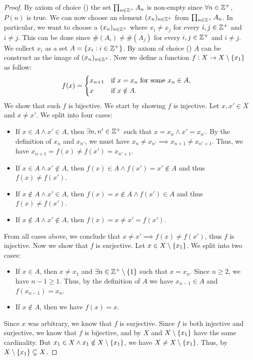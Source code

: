 \begin{proof}
  By axiom of choice () the set \(\prod_{n \in \mathbb{Z}^+} A_n\) is non-empty since \(\forall n \in \mathbb{Z}^+\), \(P(n)\) is true.
  We can now choose an element \((x_n)_{n \in \mathbb{Z}^+}\) from \(\prod_{n \in \mathbb{Z}^+} A_n\).
  In particular, we want to choose a \((x_n)_{n \in \mathbb{Z}^+}\) where \(x_i \neq x_j\) for every \(i, j \in \mathbb{Z}^+\) and \(i \neq j\).
  This can be done since \(\#(A_i) \neq \#(A_j)\) for every \(i, j \in \mathbb{Z}^+\) and \(i \neq j\).
  We collect \(x_i\) as a set \(A = \left\lbrace x_i : i \in \mathbb{Z}^+\right\rbrace\).
  By axiom of choice () \(A\) can be construct as the image of \((x_n)_{n \in \mathbb{Z}^+}\).
  Now we define a function \(f : X \to X \setminus \left\lbrace x_1\right\rbrace\) as follow:
  \[
    f(x) = \begin{dcases}
      x_{n + 1} & \text{if } x = x_n \text{ for some } x_n \in A, \\
      x         & \text{if } x \notin A.
    \end{dcases}
  \]
  We show that such \(f\) is bijective.
  We start by showing \(f\) is injective.
  Let \(x, x' \in X\) and \(x \neq x'\).
  We split into four cases:
  \begin{itemize}
    \item If \(x \in A \land x' \in A\), then \(\exists n, n' \in \mathbb{Z}^+\) such that \(x = x_n \land x' = x_{n'}\).
          By the definition of \(x_n\) and \(x_{n'}\), we must have \(x_n \neq x_{n'} \implies x_{n + 1} \neq x_{n' + 1}\).
          Thus, we have \(x_{n + 1} = f(x) \neq f(x') = x_{n' + 1}\).
    \item If \(x \in A \land x' \notin A\), then \(f(x) \in A \land f(x') = x' \notin A\) and thus \(f(x) \neq f(x')\).
    \item If \(x \notin A \land x' \in A\), then \(f(x) = x \notin A \land f(x') \in A\) and thus \(f(x) \neq f(x')\).
    \item If \(x \notin A \land x' \notin A\), then \(f(x) = x \neq x' = f(x')\).
  \end{itemize}
  From all cases above, we conclude that \(x \neq x' \implies f(x) \neq f(x')\), thus \(f\) is injective.
  Now we show that \(f\) is surjective.
  Let \(x \in X \setminus \left\lbrace x_1\right\rbrace\).
  We split into two cases:
  \begin{itemize}
    \item If \(x \in A\), then \(x \neq x_1\) and \(\exists n \in \mathbb{Z}^+ \setminus \left\lbrace1\right\rbrace\) such that \(x = x_n\).
          Since \(n \geq 2\), we have \(n - 1 \geq 1\).
          Thus, by the definition of \(A\) we have \(x_{n - 1} \in A\) and \(f(x_{n - 1}) = x_n\).
    \item If \(x \notin A\), then we have \(f(x) = x\).
  \end{itemize}
  Since \(x\) was arbitrary, we know that \(f\) is surjective.
  Since \(f\) is both injective and surjective, we know that \(f\) is bijective, and by  \(X\) and \(X \setminus \left\lbrace x_1\right\rbrace\) have the same cardinality.
  But \(x_1 \in X \land x_1 \notin X \setminus \left\lbrace x_1\right\rbrace\), we have \(X \neq X \setminus \left\lbrace x_1\right\rbrace\).
  Thus, by  \(X \setminus \left\lbrace x_1\right\rbrace \subsetneq X\).


\end{proof}
